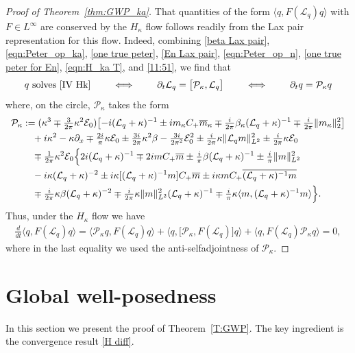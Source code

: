 \documentclass{amsart}
\numberwithin{equation}{section}
\theoremstyle{definition}
\newcommand{\ka}{\kappa}
\newcommand{\E}{\mathcal{E}}
\newcommand{\Lc}{\mathcal{L}}
\newcommand{\dd}{\partial}
\newcommand{\lan}{\langle}
\newcommand{\ran}{\rangle}
\begin{document}
\begin{proof}[Proof of Theorem~\ref{thm:GWP_ka}]
That quantities of the form $\langle q, F(\Lc_q) q\rangle$ with $F\in L^\infty$ are conserved by the $H_\ka$ flow follows readily from the Lax pair representation for this flow.  Indeed, combining \eqref{beta Lax pair}, \eqref{eqn:Peter_op_ka}, \eqref{one true peter}, \eqref{En Lax pair}, \eqref{eqn:Peter_op_n}, \eqref{one true peter for En}, \eqref{eqn:H_ka T}, and \eqref{11:51}, we find that
\begin{equation}
\text{$q$ solves \eqref{IV Hk}} \qquad \iff \qquad \dd_t \Lc_q = \bigl[\mathcal{P_\ka},\Lc_q\bigr] \qquad \iff\qquad \dd_t q=\mathcal{P_\ka}q \label{Hk Lax pair}
\end{equation}
where, on the circle, $\mathcal P_\ka$ takes the form
\begin{align*}
\mathcal{P_\ka}&:=(\ka^3\mp \tfrac3{2\pi}\ka^2\E_0)\bigl[-i(\Lc_q+\ka)^{-1}\pm im_\ka C_+ \overline m_\ka \mp\tfrac{i}{2\pi}\beta_\ka(\Lc_q+\ka)^{-1} \mp\tfrac{i}{2\pi}\|m_\ka\|_2^2\bigr]\\
&\quad+i\ka^2 -\ka \partial_x  \mp\tfrac{2i}{\pi}\ka \E_0 \pm \tfrac{3i}{2\pi}\ka^2\beta -\tfrac{3i}{2\pi^2}\E_0^2\pm \tfrac{i}{2\pi}\ka \| \Lc_q m\|_{L^2}^2\pm \tfrac{i}{2\pi}\ka\E_0\\
&\quad\mp\tfrac{1}{2\pi}\ka^2\E_0\Bigl\{2i (\Lc_q+\ka)^{-1} \mp2i m C_+\overline{m}\pm\tfrac{i}{\pi} \beta(\Lc_q+\ka)^{-1}\pm\tfrac{i}{\pi} \|m\|^2_{L^2}\nonumber\\
&\quad-i \ka(\Lc_q+\ka)^{-2}\pm i\ka[(\Lc_q+\ka)^{-1}m] C_+\overline{m}\pm i\ka m C_+\overline{(\Lc_q+\ka)^{-1}m}\nonumber\\
&\quad\mp\tfrac{i}{2\pi}\ka\beta(\Lc_q+\ka)^{-2}\mp\tfrac{i}{2\pi}\ka \|m\|_{L^2}^2(\Lc_q+\ka)^{-1}\mp\tfrac{i}{\pi}\ka \lan m,(\Lc_q+\ka)^{-1}m\ran\Bigr\}.
\end{align*}
Thus, under the $H_\ka$ flow we have
\begin{align*}
\tfrac{d}{dt} \langle q, F(\Lc_q) q\rangle = \langle \mathcal{P_\ka} q, F(\Lc_q) q\rangle +  \langle q,\bigl[ \mathcal{P_\ka}, F(\Lc_q) \bigr] q\rangle + \langle q, F(\Lc_q)  \mathcal{P_\ka} q\rangle=0,
\end{align*}
where in the last equality we used the anti-selfadjointness of $\mathcal{P_\ka}$.
\end{proof}

\section{Global well-posedness}\label{sec:convergence}
In this section we present the proof of Theorem~\ref{T:GWP}. The key ingredient is the convergence result \eqref{H diff}.
\end{document}
